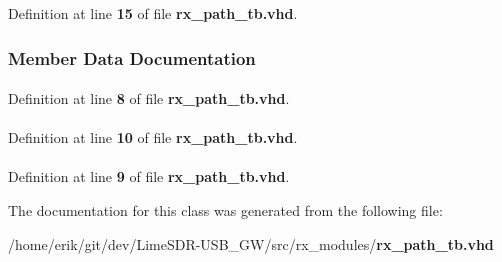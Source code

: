 Definition at line {\bf 15} of file {\bf rx\+\_\+path\+\_\+tb.\+vhd}.



\subsubsection{Member Data Documentation}
\paragraph[{ieee}]{\hspace{0.3cm}{\ttfamily [Library]}}\label{classrx__path__tb_a0a6af6eef40212dbaf130d57ce711256}


Definition at line {\bf 8} of file {\bf rx\+\_\+path\+\_\+tb.\+vhd}.

\paragraph[{numeric\+\_\+std}]{\hspace{0.3cm}{\ttfamily [Package]}}\label{classrx__path__tb_a2edc34402b573437d5f25fa90ba4013e}


Definition at line {\bf 10} of file {\bf rx\+\_\+path\+\_\+tb.\+vhd}.

\paragraph[{std\+\_\+logic\+\_\+1164}]{\hspace{0.3cm}{\ttfamily [Package]}}\label{classrx__path__tb_acd03516902501cd1c7296a98e22c6fcb}


Definition at line {\bf 9} of file {\bf rx\+\_\+path\+\_\+tb.\+vhd}.



The documentation for this class was generated from the following file\+:\begin{DoxyCompactItemize}
\item 
/home/erik/git/dev/\+Lime\+S\+D\+R-\/\+U\+S\+B\+\_\+\+G\+W/src/rx\+\_\+modules/{\bf rx\+\_\+path\+\_\+tb.\+vhd}\end{DoxyCompactItemize}
